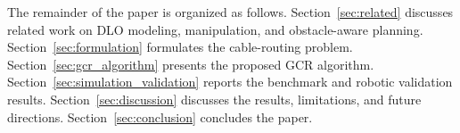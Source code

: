 \documentclass{pas}
\begin{document}
The remainder of the paper is organized as follows. Section~\ref{sec:related} discusses related work on DLO modeling, manipulation, and obstacle-aware planning. Section~\ref{sec:formulation} formulates the cable-routing problem. Section~\ref{sec:gcr_algorithm} presents the proposed GCR algorithm. Section~\ref{sec:simulation_validation} reports the benchmark and robotic validation results. Section~\ref{sec:discussion} discusses the results, limitations, and future directions. Section~\ref{sec:conclusion} concludes the paper.




\end{document}
